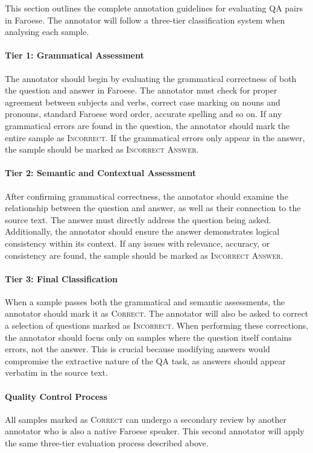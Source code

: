 \documentclass[11pt]{article}
\begin{document}
This section outlines the complete annotation guidelines for evaluating QA pairs in
Faroese. The annotator will follow a three-tier classification system when analysing
each sample.

\paragraph{Tier 1: Grammatical Assessment}
The annotator should begin by evaluating the grammatical correctness of both the
question and answer in Faroese. The annotator must check for proper agreement between
subjects and verbs, correct case marking on nouns and pronouns, standard Faroese word
order, accurate spelling and so on. If any grammatical errors are found in the question,
the annotator should mark the entire sample as \textsc{Incorrect}. If the grammatical
errors only appear in the answer, the sample should be marked as \textsc{Incorrect
Answer}.

\paragraph{Tier 2: Semantic and Contextual Assessment}
After confirming grammatical correctness, the annotator should examine the relationship
between the question and answer, as well as their connection to the source text. The
answer must directly address the question being asked. Additionally, the annotator
should ensure the answer demonstrates logical consistency within its context. If any
issues with relevance, accuracy, or consistency are found, the sample should be marked
as \textsc{Incorrect Answer}.

\paragraph{Tier 3: Final Classification}
When a sample passes both the grammatical and semantic assessments, the annotator should
mark it as \textsc{Correct}. The annotator will also be asked to correct a selection of
questions marked as \textsc{Incorrect}. When performing these corrections, the annotator
should focus only on samples where the question itself contains errors, not the answer.
This is crucial because modifying answers would compromise the extractive nature of the
QA task, as answers should appear verbatim in the source text.

\paragraph{Quality Control Process}
All samples marked as \textsc{Correct} can undergo a secondary review by another
annotator who is also a native Faroese speaker. This second annotator will apply the
same three-tier evaluation process described above.
\end{document}
